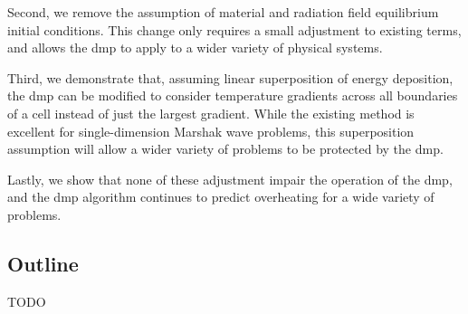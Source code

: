 Second, we remove the assumption of material and radiation field equilibrium initial conditions.  This change only requires a small adjustment to existing terms, and allows the \gls{dmp} to apply to a wider variety of physical systems.

Third, we demonstrate that, assuming linear superposition of energy deposition, the \gls{dmp} can be modified to consider temperature gradients across all boundaries of a cell instead of just the largest gradient.  While the existing method is excellent for single-dimension Marshak wave problems, this superposition assumption will allow a wider variety of problems to be protected by the \gls{dmp}.

Lastly, we show that none of these adjustment impair the operation of the \gls{dmp}, and the \gls{dmp} algorithm continues to predict overheating for a wide variety of problems.

\subsection{Outline}
TODO
